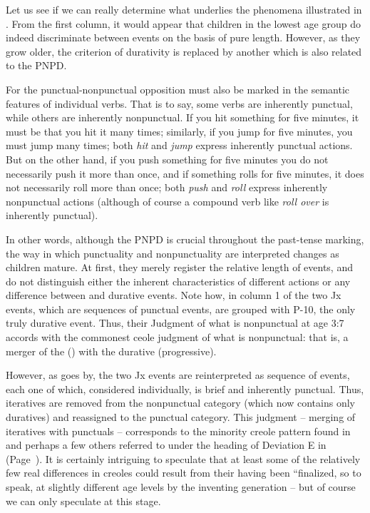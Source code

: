 Let us see if we can really determine what underlies the phenomena illustrated in . From the first column, it would appear that children in the lowest age group do indeed discriminate between events on the basis of pure length. However, as they grow older, the criterion of durativity is replaced by another which is also related to the PNPD.

For the punctual-nonpunctual opposition must also be marked in the semantic features of individual verbs. That is to say, some verbs are inherently punctual, while others are inherently nonpunctual. If you hit something for five minutes, it must be that you hit it many
times; similarly, if you jump for five minutes, you must jump many times; both \textit{hit} and \textit{jump} express inherently punctual actions. But on the other hand, if you push something for five minutes you do not necessarily push it more than once, and if something rolls for five minutes, it does not necessarily roll more than once; both \textit{push} and \textit{roll} express inherently nonpunctual actions (although of course a compound verb like \textit{roll over} is inherently punctual).

In other words, although the PNPD is crucial throughout the  past-tense marking, the way in which punctuality and nonpunctuality are interpreted changes as children mature. At first, they merely register the relative length of events, and do not distinguish either the inherent characteristics of different actions or any difference between  and durative events. Note how, in column 1 of  the two Jx events, which are sequences of punctual events, are grouped with P-10, the only truly durative event. Thus, their Judgment of what is nonpunctual at age 3:7 accords with the commonest ceole judgment of what is nonpunctual: that is, a merger of the  () with the durative (progressive).

However, as  goes by, the two Jx events are reinterpreted as sequence of events, each one of which, considered individually, is brief and inherently punctual. Thus, iteratives are removed from the nonpunctual category (which now contains only duratives) and reassigned to the punctual category. This judgment -- merging of iteratives with punctuals -- corresponds to the minority creole pattern found in  and perhaps a few others referred to under the heading of Deviation E in  (Page~\pageref{majordeviations}). It is certainly intriguing to speculate that at least some of the relatively few real differences in creoles could result from their having been ``finalized, so to speak, at slightly different age levels by the inventing generation -- but of course we can only speculate at this stage.

